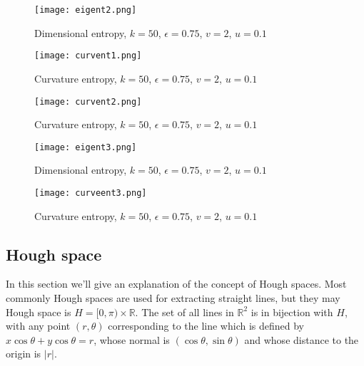 \documentclass[a4paper,11pt,twoside]{article}
\theoremstyle{definition}
\theoremstyle{remark}
\begin{document}
\begin{figure}[!h]
  \caption{Dimensional entropy, $k = 50$, $\epsilon = 0.75$, $v = 2$, $u=0.1$}
  \centering
    \texttt{[image: eigent2.png]}
    \label{eigent2}
\end{figure}
\newpage
\begin{figure}[!h]
  \caption{Curvature entropy, $k = 50$, $\epsilon = 0.75$, $v = 2$, $u=0.1$}
  \centering
    \texttt{[image: curvent1.png]}
    \label{curvent1}
\end{figure}

\begin{figure}[!h]
  \caption{Curvature entropy, $k = 50$, $\epsilon = 0.75$, $v = 2$, $u=0.1$}
  \centering
    \texttt{[image: curvent2.png]}
    \label{curvent2}
\end{figure}
\newpage
\begin{figure}[!h]
  \caption{Dimensional entropy, $k = 50$, $\epsilon = 0.75$, $v = 2$, $u=0.1$}
  \centering
    \texttt{[image: eigent3.png]}
    \label{eigent3}
\end{figure}

\begin{figure}[!h]
  \caption{Curvature entropy, $k = 50$, $\epsilon = 0.75$, $v = 2$, $u=0.1$}
  \centering
    \texttt{[image: curveent3.png]}
    \label{curvent3}
\end{figure}
\newpage 
\subsection{Hough space}\label{hough}
In this section we'll give an explanation of the concept of Hough spaces. Most commonly Hough spaces are used for extracting straight lines, but they may
Hough space is $H = [0,\pi)\times \mathbb{R}$. The set of all lines in $\mathbb{R}^2$ is in bijection with $H$, with any point $(r,\theta)$ corresponding to the line which is defined by $x\cos\theta +y\cos\theta=r$, whose normal is $(\cos\theta,\sin\theta)$ and whose distance to the origin is $|r|$.
\end{document}
